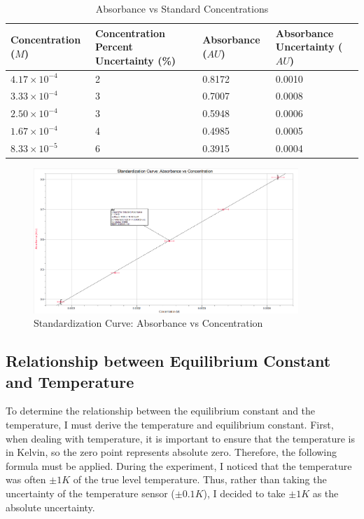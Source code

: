 \begin{table}[H]
\centering
\begin{tabular}{|C{2.5cm}|C{4cm}|C{2.5cm}|C{3.5cm}|}
\hline
Concentration (\(M\)) & Concentration Percent Uncertainty (\%) & Absorbance (\(AU\)) & Absorbance Uncertainty (\(AU\)) \\ \hline
\(4.17 \times 10^{-4}\)            & 2                                        & 0.8172             & 0.0010                          \\ \hline
\(3.33 \times 10^{-4}\)            & 3                                        & 0.7007             & 0.0008                          \\ \hline
\(2.50 \times 10^{-4}\)           & 3                                        & 0.5948             & 0.0006                          \\ \hline
\(1.67 \times 10^{-4}\)            & 4                                        & 0.4985             & 0.0005                          \\ \hline
\(8.33 \times 10^{-5}\)            & 6                                       & 0.3915             & 0.0004                          \\ \hline
\end{tabular}
\caption{Absorbance vs Standard Concentrations}
\label{table:absorbance_standard_concentrations}
\end{table}

\begin{figure}[H]
    \centering
    \includegraphics[width=100mm,height=\textheight,keepaspectratio]{images/standardization_curve.png}
    \caption{Standardization Curve: Absorbance vs Concentration}
    \label{fig:standardization_curve}
\end{figure}

\subsection{Relationship between Equilibrium Constant and Temperature}
To determine the relationship between the equilibrium constant and the temperature, I must derive the temperature and equilibrium constant. First, when dealing with temperature, it is important to ensure that the temperature is in Kelvin, so the zero point represents absolute zero. Therefore, the following formula must be applied. During the experiment, I noticed that the temperature was often \(\pm 1K\) of the true level temperature. Thus, rather than taking the uncertainty of the temperature sensor (\(\pm0.1K\)), I decided to take \(\pm 1K\) as the absolute uncertainty.

